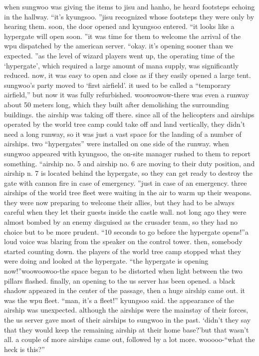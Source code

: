 when sungwoo was giving the items to jisu and hanho, he heard footsteps echoing in the hallway.
“it’s kyungsoo.
”jisu recognized whose footsteps they were only by hearing them.
soon, the door opened and kyungsoo entered.
“it looks like a hypergate will open soon.
”it was time for them to welcome the arrival of the wpu dispatched by the american server.
“okay.
 it’s opening sooner than we expected.
”as the level of wizard players went up, the operating time of the ‘hypergate’, which required a large amount of mana supply, was significantly reduced.
 now, it was easy to open and close as if they easily opened a large tent.
sungwoo’s party moved to ‘first airfield’.
 it used to be called a “temporary airfield,” but now it was fully refurbished.
woowoowow-there was even a runway about 50 meters long, which they built after demolishing the surrounding buildings.
 the airship was taking off there.
since all of the helicopters and airships operated by the world tree camp could take off and land vertically, they didn’t need a long runway, so it was just a vast space for the landing of a number of airships.
two “hypergates” were installed on one side of the runway.
 when sungwoo appeared with kyungsoo, the on-site manager rushed to them to report something.
“airship no.
 5 and airship no.
 6 are moving to their duty position, and airship n.
 7 is located behind the hypergate, so they can get ready to destroy the gate with cannon fire in case of emergency.
”just in case of an emergency.
 three airships of the world tree fleet were waiting in the air to warm up their weapons.
they were now preparing to welcome their allies, but they had to be always careful when they let their guests inside the castle wall.
not long ago they were almost bombed by an enemy disguised as the crusader team, so they had no choice but to be more prudent.
“10 seconds to go before the hypergate opens!”a loud voice was blaring from the speaker on the control tower.
 then, somebody started counting down.
the players of the world tree camp stopped what they were doing and looked at the hypergate.
“the hypergate is opening now!”woowoowoo-the space began to be distorted when light between the two pillars flashed.
finally, an opening to the us server has been opened.
a black shadow appeared in the center of the passage, then a huge airship came out.
it was the wpu fleet.
“man, it’s a fleet!” kyungsoo said.
the appearance of the airship was unexpected.
 although the airships were the mainstay of their forces, the us server gave most of their airships to sungwoo in the past.
‘didn’t they say that they would keep the remaining airship at their home base?’but that wasn’t all.
 a couple of more airships came out, followed by a lot more.
wooooo-“what the heck is this?”

